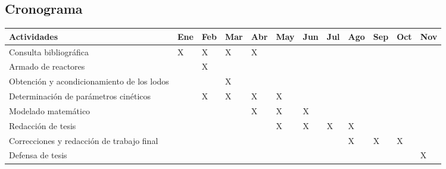 \subsection*{Cronograma}
	\begin{center}
	\begin{footnotesize}
		\begin{tabular}{|p{5.5cm}|p{0.5cm}|p{0.5cm}|p{0.5cm}|p{0.5cm}|p{0.5cm}|p{0.5cm}|p{0.5cm}|p{0.5cm}|p{0.5cm}|p{0.5cm}|p{0.5cm}|}
		\hline
		\rowcolor{blanc}
		Actividades & Ene & Feb & Mar & Abr & May & Jun & Jul & Ago & Sep & Oct & Nov \\ \hline
		\cellcolor{smk} Consulta bibliográfica & \cellcolor{grn}\centering X & \cellcolor{grn}\centering X & \cellcolor{grn}\centering X & \cellcolor{grn}\centering X & & & & & & & \\ \hline
		\cellcolor{smk} Armado de reactores & & \cellcolor{grn}\centering X & & & & & & & & & \\ \hline
		\cellcolor{smk} \scriptsize{Obtención y acondicionamiento de los lodos} & & & \cellcolor{grn}\centering X & & & & & & & & \\ \hline
		\cellcolor{smk} \scriptsize{Determinación de parámetros cinéticos} & & \cellcolor{grn}\centering X & \cellcolor{grn}\centering X & \cellcolor{grn}\centering X & \cellcolor{grn}\centering X & & & & & & \\ \hline
		\cellcolor{smk} Modelado matemático & & & & \cellcolor{grn}\centering X & \cellcolor{grn}\centering X & \cellcolor{grn}\centering X & & & & & \\ \hline
		\cellcolor{smk} Redacción de tesis & & & & & \cellcolor{grn}\centering X & \cellcolor{grn}\centering X & \cellcolor{grn}\centering X & \cellcolor{grn}\centering X & & & \\ \hline
		\cellcolor{smk} \scriptsize{Correcciones y redacción de trabajo final} & & & & & & & & \cellcolor{grn}\centering X & \cellcolor{grn}\centering X & \cellcolor{grn}\centering X & \\ \hline
		\cellcolor{smk} Defensa de tesis & & & & & & & & & & & \cellcolor{grn}\centering X \tabularnewline \hline
		\end{tabular}
	\end{footnotesize}
	\end{center}

 

